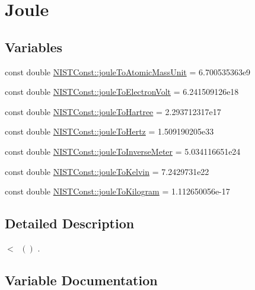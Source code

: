 \hypertarget{group___joule}{}\section{Joule}
\label{group___joule}
\subsection*{Variables}
\begin{DoxyCompactItemize}
\item 
const double \hyperlink{group___joule_ga6a8cba6b834ee62ab61671208b1ae9ee}{N\+I\+S\+T\+Const\+::joule\+To\+Atomic\+Mass\+Unit} = 6.\+700535363e9
\item 
const double \hyperlink{group___joule_ga08ffcdfd701ba898a91b0cbdde4d0e2d}{N\+I\+S\+T\+Const\+::joule\+To\+Electron\+Volt} = 6.\+241509126e18
\item 
const double \hyperlink{group___joule_gac067d2d31bf56c3abe63559dac6c00d7}{N\+I\+S\+T\+Const\+::joule\+To\+Hartree} = 2.\+293712317e17
\item 
const double \hyperlink{group___joule_ga6ac361417bc6b472bf80fcfef276d742}{N\+I\+S\+T\+Const\+::joule\+To\+Hertz} = 1.\+509190205e33
\item 
const double \hyperlink{group___joule_gaa8de9ad07a642c1b9c1d4ee15125a917}{N\+I\+S\+T\+Const\+::joule\+To\+Inverse\+Meter} = 5.\+034116651e24
\item 
const double \hyperlink{group___joule_ga506f23a4b88678bd7ee6f1067e97aa83}{N\+I\+S\+T\+Const\+::joule\+To\+Kelvin} = 7.\+2429731e22
\item 
const double \hyperlink{group___joule_ga250f161277a6e581e695dccb7c11d1fb}{N\+I\+S\+T\+Const\+::joule\+To\+Kilogram} = 1.\+112650056e-\/17
\end{DoxyCompactItemize}


\subsection{Detailed Description}
$<$ $ \ ()$ . 

\subsection{Variable Documentation}
\mbox{\label{group___joule_ga6a8cba6b834ee62ab61671208b1ae9ee}} 
